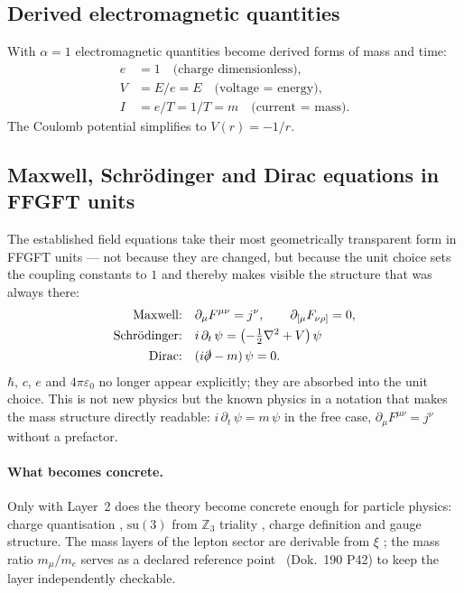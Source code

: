 \subsection*{Derived electromagnetic quantities}

With $\alpha=1$ electromagnetic quantities become derived forms of mass and time:
\begin{align*}
  e &= 1 \quad \text{(charge dimensionless)},\\
  V &= E/e = E \quad \text{(voltage = energy)},\\
  I &= e/T = 1/T = m \quad \text{(current = mass)}.
\end{align*}
The Coulomb potential simplifies to $V(r)=-1/r$.

\subsection*{Maxwell, Schrödinger and Dirac equations in FFGFT units}

The established field equations take their most geometrically transparent form
in FFGFT units --- not because they are changed, but because the unit choice
sets the coupling constants to $1$ and thereby makes visible the structure that
was always there:
\begin{align*}
\text{Maxwell:}\quad &
  \partial_\mu F^{\mu\nu} = j^\nu, \qquad
  \partial_{[\mu}F_{\nu\rho]}=0,\\
\text{Schrödinger:}\quad &
  i\,\partial_t\,\psi = \left(-\tfrac12\nabla^2 + V\right)\psi\\
\text{Dirac:}\quad &
  (i\slashed\partial - m)\,\psi = 0.
\end{align*}
$\hbar$, $c$, $e$ and $4\pi\varepsilon_0$ no longer appear explicitly; they
are absorbed into the unit choice. This is not new physics but the known physics
in a notation that makes the mass structure directly readable: $i\,\partial_t\,\psi=m\,\psi$
in the free case, $\partial_\mu F^{\mu\nu}=j^\nu$ without a prefactor.

\paragraph{What becomes concrete.}
Only with Layer~2 does the theory become concrete enough for particle physics:
charge quantisation \BM, $\mathrm{su}(3)$ from $\mathbb{Z}_3$ triality \BM,
charge definition and gauge structure. The mass layers of the lepton sector are
derivable from $\xi$ \KM; the mass ratio $m_\mu/m_e$ serves as a declared
reference point \SetzM\ (Dok.~190 P42) to keep the layer independently checkable.

